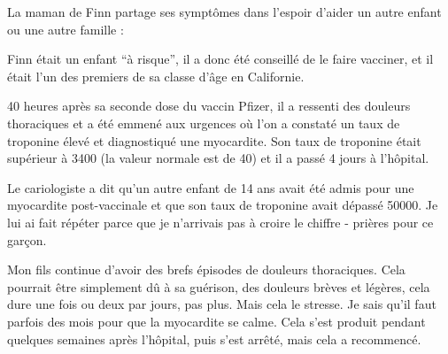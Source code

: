 La maman de Finn partage ses symptômes dans l'espoir d'aider un autre enfant ou
une autre famille :

Finn était un enfant “à risque”, il a donc été conseillé de le faire vacciner,
et il était l'un des premiers de sa classe d'âge en Californie.

40 heures après sa seconde dose du vaccin Pfizer, il a ressenti des douleurs
thoraciques et a été emmené aux urgences où l'on a constaté un taux de troponine
élevé et diagnostiqué une myocardite. Son taux de troponine était supérieur à
3400 (la valeur normale est de 40) et il a passé 4 jours à l'hôpital.

Le cariologiste a dit qu'un autre enfant de 14 ans avait été admis pour une
myocardite post-vaccinale et que son taux de troponine avait dépassé 50000. Je
lui ai fait répéter parce que je n'arrivais pas à croire le chiffre - prières
pour ce garçon.

Mon fils continue d'avoir des brefs épisodes de douleurs thoraciques. Cela
pourrait être simplement dû à sa guérison, des douleurs brèves et légères, cela
dure une fois ou deux par jours, pas plus. Mais cela le stresse. Je sais qu'il
faut parfois des mois pour que la myocardite se calme. Cela s'est produit
pendant quelques semaines après l'hôpital, puis s'est arrêté, mais cela a
recommencé.

